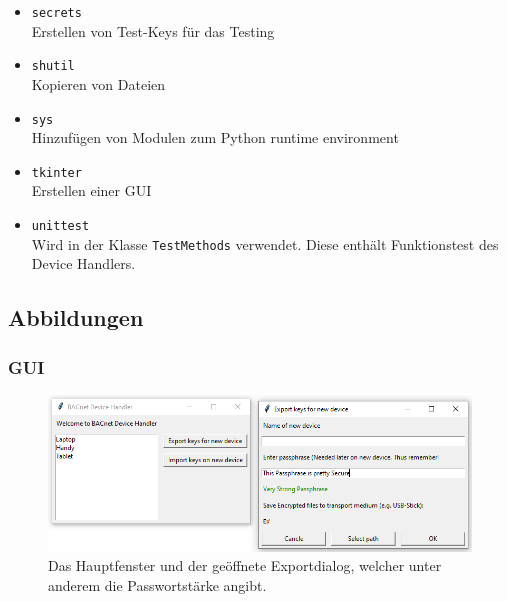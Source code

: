 \documentclass[a4paper,titlepage]{article}
\newcommand{\ilc}[1]{\textcolor{codeColor}{\texttt{#1}}}
\begin{document}
\begin{itemize}
			\item \ilc{secrets} \\
				Erstellen von Test-Keys für das Testing
			\item \ilc{shutil} \\
				Kopieren von Dateien
			\item \ilc{sys} \\
				Hinzufügen von Modulen zum Python runtime environment
			\item \ilc{tkinter} \\
				Erstellen einer GUI				
			\item \ilc{unittest} \\
				Wird in der Klasse \ilc{TestMethods} verwendet. Diese enthält Funktionstest des Device Handlers.
		\end{itemize}
		
\newpage

	\subsection{Abbildungen}
		\subsubsection{GUI} 	\label{fig:UI}
		\begin{figure}[H] %
			\centering
			\includegraphics[width=1\textwidth]{figures/UI}
			\caption*{Das Hauptfenster und der geöffnete Exportdialog, welcher unter anderem die Passwortstärke angibt.}
		\end{figure}
		
		\subsubsection{}
		
\end{document}
